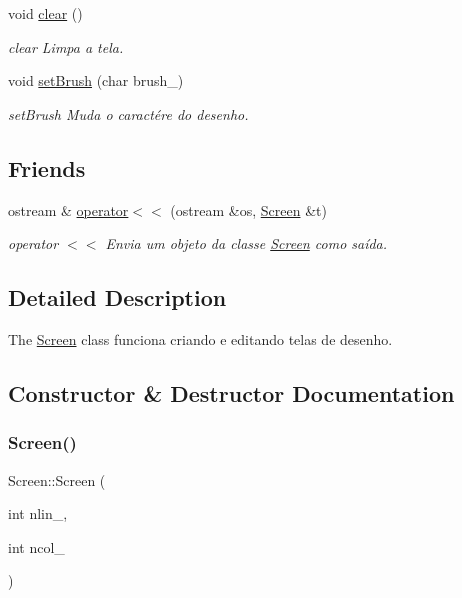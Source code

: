 \begin{DoxyCompactItemize}
\mbox{\label{class_screen_a35e74266b2a04e37b354ceff7a5f1031}} 
void \hyperlink{class_screen_a35e74266b2a04e37b354ceff7a5f1031}{clear} ()
\begin{DoxyCompactList}\small\item\em clear Limpa a tela. \end{DoxyCompactList}\item 
void \hyperlink{class_screen_a01312ae6a1168ec0a02c24877059571f}{set\+Brush} (char brush\+\_\+)
\begin{DoxyCompactList}\small\item\em set\+Brush Muda o caractére do desenho. \end{DoxyCompactList}\end{DoxyCompactItemize}
\subsection*{Friends}
\begin{DoxyCompactItemize}
\item 
ostream \& \hyperlink{class_screen_aab6a2880746bfe1b7964817cc8f0989e}{operator$<$$<$} (ostream \&os, \hyperlink{class_screen}{Screen} \&t)
\begin{DoxyCompactList}\small\item\em operator $<$$<$ Envia um objeto da classe \hyperlink{class_screen}{Screen} como saída. \end{DoxyCompactList}\end{DoxyCompactItemize}


\subsection{Detailed Description}
The \hyperlink{class_screen}{Screen} class funciona criando e editando telas de desenho. 

\subsection{Constructor \& Destructor Documentation}
\mbox{\label{class_screen_ab41e0f2754e0a7831a8fc3211bcdabca}} 
\subsubsection{\texorpdfstring{Screen()}{Screen()}}
{\footnotesize\ttfamily Screen\+::\+Screen (\begin{DoxyParamCaption}\item[{int}]{nlin\+\_\+,  }\item[{int}]{ncol\+\_\+ }\end{DoxyParamCaption})}



